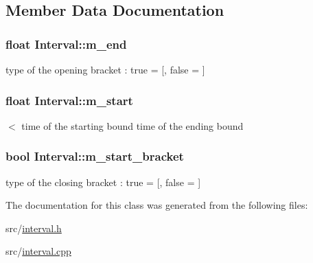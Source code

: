 \subsection{Member Data Documentation}
\hypertarget{classInterval_a81756da29621f059153f0c61df1396fd}{
\subsubsection[{m\+\_\+end}]{\setlength{\rightskip}{0pt plus 5cm}float Interval\+::m\+\_\+end\hspace{0.3cm}{\ttfamily [protected]}}}\label{classInterval_a81756da29621f059153f0c61df1396fd}
type of the opening bracket \+: true = \mbox{[}, false = \mbox{]} \hypertarget{classInterval_a2e6c892f8f3e39465cdb4ca8b01055f2}{
\subsubsection[{m\+\_\+start}]{\setlength{\rightskip}{0pt plus 5cm}float Interval\+::m\+\_\+start\hspace{0.3cm}{\ttfamily [protected]}}}\label{classInterval_a2e6c892f8f3e39465cdb4ca8b01055f2}
$<$ time of the starting bound time of the ending bound \hypertarget{classInterval_aa10723e6479131b46e82f07dc7781812}{
\subsubsection[{m\+\_\+start\+\_\+bracket}]{\setlength{\rightskip}{0pt plus 5cm}bool Interval\+::m\+\_\+start\+\_\+bracket\hspace{0.3cm}{\ttfamily [protected]}}}\label{classInterval_aa10723e6479131b46e82f07dc7781812}
type of the closing bracket \+: true = \mbox{[}, false = \mbox{]} 

The documentation for this class was generated from the following files\+:\begin{DoxyCompactItemize}
\item 
src/\hyperlink{interval_8h}{interval.\+h}\item 
src/\hyperlink{interval_8cpp}{interval.\+cpp}\end{DoxyCompactItemize}
